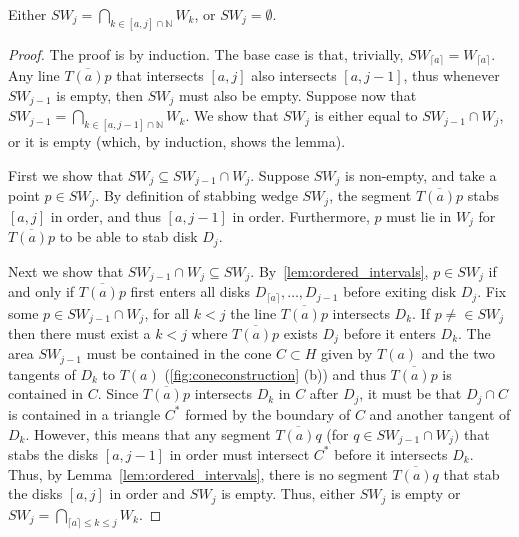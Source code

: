 \documentclass[a4paper,UKenglish,cleveref,thm-restate,notab]{lipics-v2021}
\newcommand{\N}{\mathbb{N}}
\newcommand{\ceil}[1]{\lceil#1\rceil}
\newcommand{\SW}{\mathit{SW}}
\begin{document}
    \begin{lemma}
        \label{lem:intersection}
        Either $\SW_j = \bigcap_{ k \in [a, j] \cap \N } W_k$, or $\SW_j = \emptyset$.
    \end{lemma}
    \begin{proof}
        The proof is by induction. 
        The base case is that, trivially, $\SW_{\ceil{a}} = W_{\ceil{a}}$.
        Any line $\overline{T(a) p}$ that intersects $[a, j]$ also intersects $[a, j-1]$, thus whenever $\SW_{j-1}$ is empty, then $\SW_j$ must also be empty. 
        Suppose now that $\SW_{j-1} = \bigcap_{ k \in [a, j - 1] \cap \N } W_k$. We show that  $\SW_j$ is either equal to $\SW_{j-1} \cap W_j$, or it is empty (which, by induction, shows the lemma). 
         
        First we show that $\SW_j \subseteq \SW_{j-1} \cap W_j$.
        Suppose $\SW_j$ is non-empty, and take a point $p \in \SW_j$.
        By definition of stabbing wedge $\SW_j$, the segment $\overline{T(a) p}$ stabs $[a, j]$ in order, and thus $[a, j-1]$ in order. 
        Furthermore, $p$ must lie in $W_j$ for $\overline{T(a) p}$ to be able to stab disk $D_j$.
    
        Next we show that $ \SW_{j-1} \cap W_j \subseteq \SW_j$.
        By~\cref{lem:ordered_intervals}, $p \in \SW_j$ if and only if $\overline{T(a) p}$ first enters all disks $D_{\ceil{a}}, \dots, D_{j-1}$ before exiting disk $D_j$.
        Fix some $p \in \SW_{j-1} \cap W_j$, for all $k < j$ the line $\overline{T(a) p}$ intersects $D_k$. 
        If $p \neq \in \SW_j$ then there must exist a $k < j$ where $\overline{T(a) p}$ exists $D_j$ before it enters $D_k$. 
        The area $\SW_{j-1}$ must be contained in the cone $C \subset H$ given by $T(a)$ and the two tangents of $D_k$ to $T(a)$ (\cref{fig:coneconstruction} (b)) and thus $\overline{T(a) p}$ is contained in $C$. 
        Since $\overline{T(a) p}$ intersects $D_k$ in $C$ after $D_j$, it must be that $D_j \cap C$ is contained in a triangle $C^*$ formed by the boundary of $C$ and another tangent of $D_k$. 
        However, this means that any segment $\overline{T(a) q}$ (for $q \in \SW_{j-1} \cap W_j)$ that stabs the disks $[a, j - 1]$ in order must intersect $C^*$ before it intersects $D_k$. Thus, by Lemma~\ref{lem:ordered_intervals}, there is no segment  $\overline{T(a) q}$ that stab the disks $[a, j]$ in order and $\SW_j$ is empty. 
        Thus, either $\SW_j$ is empty or $\SW_j = \bigcap_{\ceil{a} \leq k \leq j} W_k$. 
    \end{proof}
    
\end{document}

